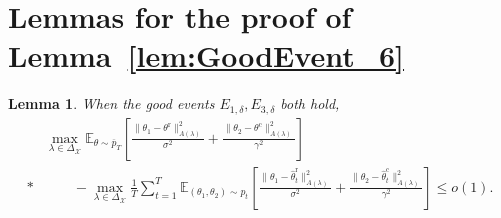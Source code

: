 \documentclass[accepted]{uai2025} %
\theoremstyle{plain}
\newtheorem{lemma}[theorem]{Lemma}
\theoremstyle{definition}
\theoremstyle{remark}
\newcommand{\hthetact}{\hat{\theta}_t^{\mathrm{c}}}
\newcommand{\hthetart}{\hat{\theta}_t^{\mathrm{r}}}
\begin{document}
\section{Lemmas for the proof of Lemma~\ref{lem:GoodEvent_6}}


\begin{lemma}
\label{lem:Regret:F1}
When the good events $E_{1,\delta}, E_{3,\delta}$ both hold,
    \begin{align*}       & \max_{\lambda \in \Delta_{\mathcal{X}}} \mathbb{E}_{\theta \sim \overline{p}_{T}} 
\left[ \frac{\|\theta_1 - \theta^\mathrm{r}\|_{A(\lambda)}^2}{\sigma^2} 
+ \frac{\|\theta_2 - \theta^\mathrm{c}\|_{{A}(\lambda)}^2}{\gamma^2}  \right]  \\*
&\qquad- \max_{\lambda \in \Delta_{\mathcal{X}}} \frac{1}{T} 
\sum_{t=1}^{T} \mathbb{E}_{(\theta_1, \theta_2) \sim p_t} 
\left[ \frac{\|\theta_1 - \hthetart\|_{A(\lambda)}^2}{\sigma^2} 
+ \frac{\|\theta_2 - \hthetact\|_{{A}(\lambda)}^2}{\gamma^2}  \right] \le o(1).
    \end{align*}
\end{lemma}
\end{document}
